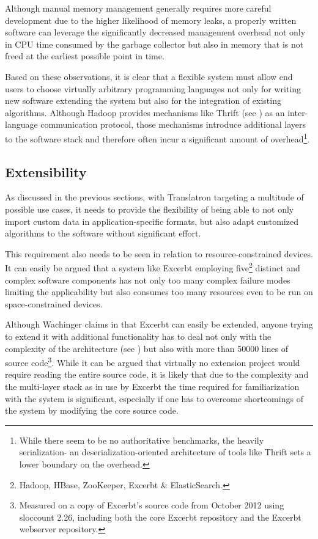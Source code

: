 \documentclass[a4paper, 12pt, twoside, reqn]{report}
\numberwithin{figure}{chapter}
\newtheorem[L]{boxedDefinition}{Definition}
\newtheorem[L]{boxedExample}{Example}
\begin{document}
Although manual memory management generally requires more careful development due to the higher likelihood of memory leaks, a properly written software can leverage the significantly decreased management overhead not only in CPU time consumed by the garbage collector but also in memory that is not freed at the earliest possible point in time.

Based on these observations, it is clear that a flexible system must allow end users to choose virtually arbitrary programming languages not only for writing new software extending the system but also for the integration of existing algorithms. Although Hadoop provides mechanisms like Thrift (see \cite{thrift}) as an inter-language communication protocol, those mechanisms introduce additional layers to the software stack and therefore often incur a significant amount of overhead\footnote{While there seem to be no authoritative benchmarks, the heavily serialization- an deserialization-oriented architecture of tools like Thrift sets a lower boundary on the overhead.}.

\subsection{Extensibility}\label{ssec:extensibility}

As discussed in the previous sections, with Translatron targeting a multitude of possible use cases, it needs to provide the flexibility of being able to not only import custom data in application-specific formats, but also adapt customized algorithms to the software without significant effort.

This requirement also needs to be seen in relation to resource-constrained devices. It can easily be argued that a system like Excerbt employing five\footnote{Hadoop, HBase, ZooKeeper, Excerbt \& ElasticSearch.} distinct and complex software components has not only too many complex failure modes limiting the applicability but also consumes too many resources even to be run on space-constrained devices.

Although Wachinger claims in \cite[section 7]{wachinger2013next} that Excerbt can easily be extended, anyone trying to extend it with additional functionality has to deal not only with the complexity of the architecture (see \cite[section 4.2]{wachinger2013next}) but also with more than 50000 lines of source code\footnote{Measured on a copy of Excerbt's source code from October 2012 using sloccount 2.26, including both the core Excerbt repository and the Excerbt webserver repository.}. While it can be argued that virtually no extension project would require reading the entire source code, it is likely that due to the complexity and the multi-layer stack as in use by Excerbt the time required for familiarization with the system is significant, especially if one has to overcome shortcomings of the system by modifying the core source code.
\end{document}
